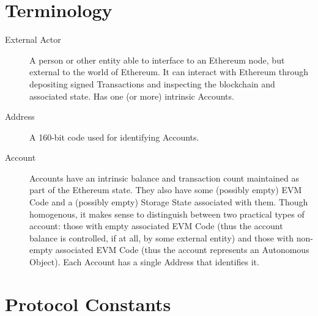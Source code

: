 \documentclass[9pt,oneside]{amsart}
\begin{document}
\appendix

\section{Terminology} \label{ch:Terminology}

\begin{description}
\item[External Actor] A person or other entity able to interface to an Ethereum node, but external to the world of Ethereum. It can interact with Ethereum through depositing signed Transactions and inspecting the blockchain and associated state. Has one (or more) intrinsic Accounts.

\item[Address] A 160-bit code used for identifying Accounts.

\item[Account] Accounts have an intrinsic balance and transaction count maintained as part of the Ethereum state. They also have some (possibly empty) EVM Code and a (possibly empty) Storage State associated with them. Though homogenous, it makes sense to distinguish between two practical types of account: those with empty associated EVM Code (thus the account balance is controlled, if at all, by some external entity) and those with non-empty associated EVM Code (thus the account represents an Autonomous Object). Each Account has a single Address that identifies it.

\end{description}

\section{Protocol Constants}\label{sec:constants1}
\end{document}
